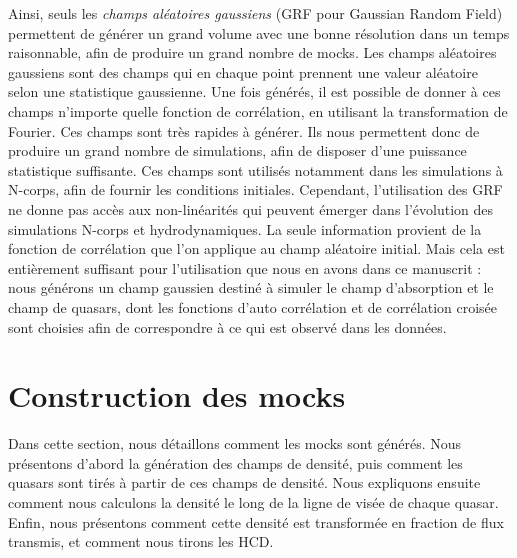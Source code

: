 Ainsi, seuls les \emph{champs aléatoires gaussiens} (GRF pour Gaussian Random Field) permettent de générer un grand volume avec une bonne résolution dans un temps raisonnable, afin de produire un grand nombre de mocks.
Les champs aléatoires gaussiens sont des champs qui en chaque point prennent une valeur aléatoire selon une statistique gaussienne.
Une fois générés, il est possible de donner à ces champs n'importe quelle fonction de corrélation, en utilisant la transformation de Fourier.
Ces champs sont très rapides à générer. Ils nous permettent donc de produire un grand nombre de simulations, afin de disposer d'une puissance statistique suffisante.
Ces champs sont utilisés notamment dans les simulations à N-corps, afin de fournir les conditions initiales.
Cependant, l'utilisation des GRF ne donne pas accès aux non-linéarités qui peuvent émerger dans l'évolution des simulations N-corps et hydrodynamiques. La seule information provient de la fonction de corrélation que l'on applique au champ aléatoire initial.
Mais cela est entièrement suffisant pour l'utilisation que nous en avons dans ce manuscrit : nous générons un champ gaussien destiné à simuler le champ d'absorption \lya{} et le champ de quasars, dont les fonctions d'auto corrélation et de corrélation croisée sont choisies afin de correspondre à ce qui est observé dans les données.


\section{Construction des mocks}
Dans cette section, nous détaillons comment les mocks sont générés.
Nous présentons d'abord la génération des champs de densité,
puis comment les quasars sont tirés à partir de ces champs de densité.
Nous expliquons ensuite comment nous calculons la densité le long de la ligne de visée de chaque quasar.
Enfin, nous présentons comment cette densité est transformée en fraction de flux transmis, et comment nous tirons les HCD.


